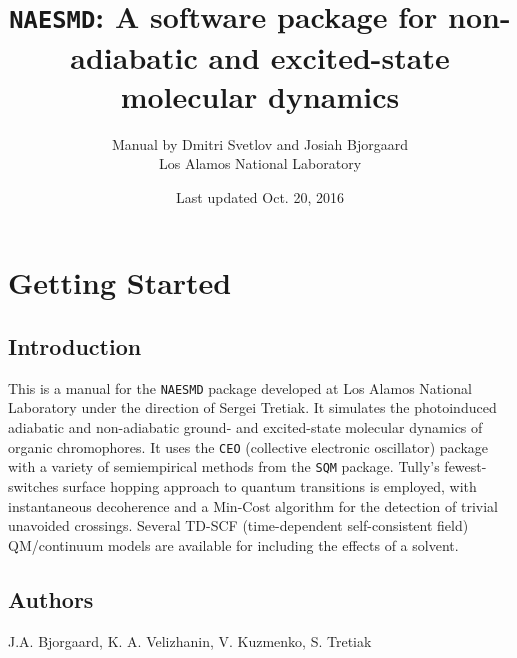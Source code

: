 \documentclass[12pt,letter,footinclude=true,headinclude=true,hyphens]{book} %
\begin{document}


\author{Manual by Dmitri Svetlov and Josiah Bjorgaard \\Los Alamos National Laboratory\\}
\date{Last updated Oct. 20, 2016}
\title{\texttt{NAESMD}: A software package for non-adiabatic and excited-state molecular dynamics}
	
	\maketitle
	
	\tableofcontents 


    \cleardoublepage\part{Getting Started}
    
    \chapter{Introduction}
    
    This is a manual for the \texttt{NAESMD} package developed at Los Alamos National Laboratory under the direction of Sergei Tretiak. It simulates the photoinduced adiabatic and non-adiabatic ground- and excited-state molecular dynamics of organic chromophores. It uses the \texttt{CEO} (collective electronic oscillator) package with a variety of semiempirical methods from the \texttt{SQM} package. Tully's fewest-switches surface hopping approach to quantum transitions is employed, with instantaneous decoherence and a Min-Cost algorithm for the detection of trivial unavoided crossings. Several TD-SCF (time-dependent self-consistent field) QM/continuum models are available for including the effects of a solvent.
    
    \chapter{Authors}
    
    J.A. Bjorgaard, K. A. Velizhanin, V. Kuzmenko, S. Tretiak
    
\end{document}
